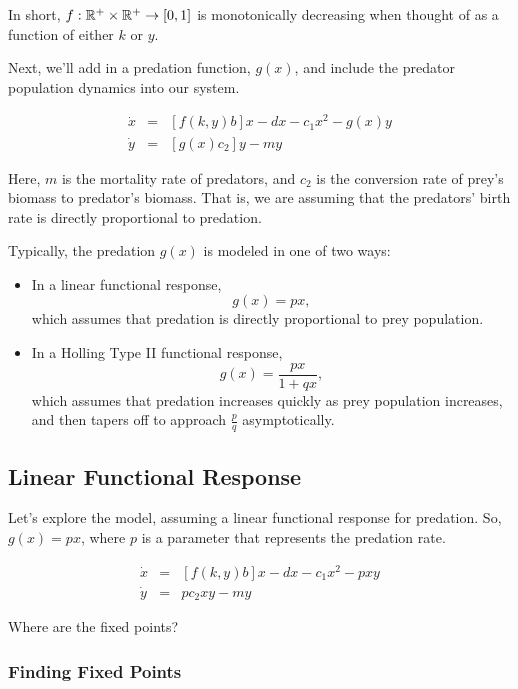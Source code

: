 \documentclass[a5paper]{article}
\theoremstyle{definition}%
\numberwithin{exercise}{section}
\theoremstyle{remark}%
\begin{document}
\mbox{}

In short, $f:\mathbb{R}^+\times\mathbb{R}^+\to[0,1]$ is monotonically decreasing when thought of as a function of either $k$ or $y$. 


Next, we'll add in a predation function, $g(x)$, and include the predator population dynamics into our system. 

\[\begin{array}{rcl}
\dot{x}&=&[f(k,y)b]x-dx-c_1x^2-g(x)y\\
\dot{y}&=&[g(x)c_2]y-my
\end{array}\]

Here, $m$ is the mortality rate of predators, and $c_2$ is the conversion rate of prey's biomass to predator's biomass. That is, we are assuming that the predators' birth rate is directly proportional to predation. 


Typically, the predation $g(x)$ is modeled in one of two ways:

\begin{itemize}
\item In a linear functional response, $$g(x)=px,$$ which assumes that predation is directly proportional to prey population.
\item In a Holling Type II functional response, $$g(x)=\frac{px}{1+qx},$$ which assumes that predation increases quickly as prey population increases, and then tapers off to approach $\frac{p}{q}$ asymptotically. 
\end{itemize}

\subsection{Linear Functional Response}

Let's explore the model, assuming a linear functional response for predation. So, $g(x)=px$, where $p$ is a parameter that represents the predation rate. 

\[\begin{array}{rcl}
\dot{x}&=&[f(k,y)b]x-dx-c_1x^2-pxy\\
\dot{y}&=&pc_2xy-my
\end{array}\]

Where are the fixed points? 

\subsubsection*{Finding Fixed Points}
\end{document}
